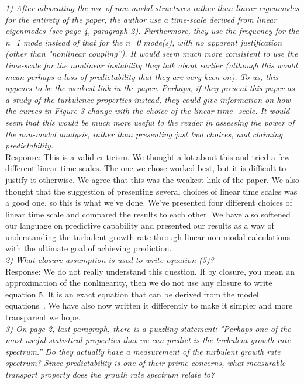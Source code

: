 \documentclass[12pt]{article}
\begin{document}
\emph{1) After advocating the use of non-modal structures rather than linear eigenmodes for the
entirety of the paper, the author use a time-scale derived from linear eigenmodes (see
page 4, paragraph 2). Furthermore, they use the frequency for the n=1 mode instead of
that for the n=0 mode(s), with no apparent justification (other than "nonlinear coupling”).
It would seem much more consistent to use the time-scale for the nonlinear instability
they talk about earlier (although this would mean perhaps a loss of predictability that they
are very keen on). To us, this appears to be the weakest link in the paper. Perhaps, if they
present this paper as a study of the turbulence properties instead, they could give
information on how the curves in Figure 3 change with the choice of the linear time-
scale. It would seem that this would be much more useful to the reader in assessing the
power of the non-modal analysis, rather than presenting just two choices, and claiming
predictability. } \\

Response: This is a valid criticism. We thought a lot about this and tried a few different linear time scales. The one we chose worked best, but it is difficult to justify it otherwise.
We agree that this was the weakest link of the paper. We also thought that the suggestion of presenting several choices of linear time scales was a good one, so this is what we've done.
We've presented four different choices of linear time scale and compared the results to each other. We have also softened our language on predictive capability and presented our results
as a way of understanding the turbulent growth rate through linear non-modal calculations with the ultimate goal of achieving prediction. \\

\emph{2) What closure assumption is used to write equation (5)?} \\

Response: We do not really understand this question. If by closure, you mean an approximation of the nonlinearity, then we do not use any closure to write equation 5. 
It is an exact equation that can be derived from the model equations~\cite{friedman2012b,friedman2013}.
We have also now written it differently to make it simpler and more transparent we hope. \\

\emph{3) On page 2, last paragraph, there is a puzzling statement: "Perhaps one of the most
useful statistical properties that we can predict is the turbulent growth rate spectrum.” Do
they actually have a measurement of the turbulent growth rate spectrum? Since
predictability is one of their prime concerns, what measurable transport property does the
growth rate spectrum relate to?} \\
\end{document}
